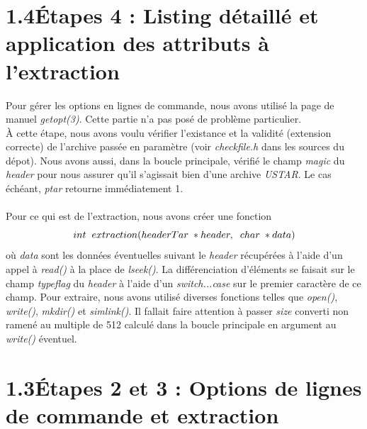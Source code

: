 \documentclass[12pt, a4paper]{report}
\begin{document}
\section*{\hspace{0.6cm}1.4\hspace{0.6cm}Étapes 4 : Listing détaillé et application des attributs à l'extraction}
\hspace{1cm}Pour gérer les options en lignes de commande, nous avons utilisé la page de manuel \textit{getopt(3)}. Cette partie n'a pas posé de problème particulier.\\

\hspace{0.5cm}À cette étape, nous avons voulu vérifier l'existance et la validité (extension correcte) de l'archive passée en paramètre (voir \textit{checkfile.h} dans les sources du dépot). Nous avons aussi, dans la boucle principale, vérifié le champ \textit{magic} du \textit{header} pour nous assurer qu'il s'agissait bien d'une archive \textit{USTAR}. Le cas échéant, \textit{ptar} retourne immédiatement 1.\\
\\

\hspace{0.5cm}Pour ce qui est de l'extraction, nous avons créer une fonction \[int\hspace{0.2cm}extraction(headerTar\hspace{0.1cm}*header,\hspace{0.2cm}char\hspace{0.1cm}*data)\] où \textit{data} sont les données éventuelles suivant le \textit{header} récupérées à l'aide d'un appel à \textit{read()} à la place de \textit{lseek()}. La différenciation d'éléments se faisait sur le champ \textit{typeflag} du \textit{header} à l'aide d'un \textit{switch...case} sur le premier caractère de ce champ. Pour extraire, nous avons utilisé diverses fonctions telles que \textit{open()}, \textit{write()}, \textit{mkdir()} et \textit{simlink()}. Il fallait faire attention à passer \textit{size} converti non ramené au multiple de 512 calculé dans la boucle principale en argument au \textit{write()} éventuel.

\section*{\hspace{0.6cm}1.3\hspace{0.6cm}Étapes 2 et 3 : Options de lignes de commande et extraction}
\end{document}
